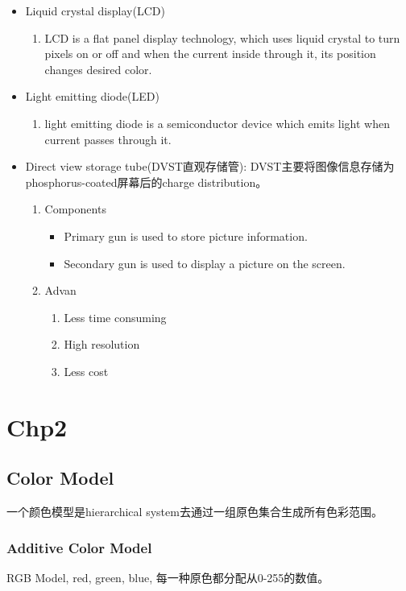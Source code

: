 \documentclass[UTF8]{ctexart}
\begin{document}
\begin{itemize}
\begin{enumerate}
    \end{enumerate}
    \item Liquid crystal display(LCD)
    \begin{enumerate}
        \item LCD is a flat panel display technology, which uses liquid crystal to turn pixels on or off and when the current inside through it, its position changes desired color. 
    \end{enumerate}
    \item Light emitting diode(LED)
    \begin{enumerate}
        \item light emitting diode is a semiconductor device which emits light when current passes through it.
    \end{enumerate}
    \item Direct view storage tube(DVST直观存储管):
    DVST主要将图像信息存储为phosphorus-coated屏幕后的charge distribution。
    \begin{enumerate}
        \item Components
        \begin{itemize}
            \item Primary gun is used to store picture information.
            \item Secondary gun is used to display a picture on the screen.
        \end{itemize}
        \item Advan
        \begin{enumerate}
            \item Less time consuming
            \item High resolution
            \item Less cost
        \end{enumerate}
    \end{enumerate}
\end{itemize}
\section{Chp2}
\subsection{Color Model}
一个颜色模型是hierarchical system去通过一组原色集合生成所有色彩范围。
\subsubsection{Additive Color Model}
RGB Model, red, green, blue, 每一种原色都分配从0-255的数值。
\end{document}
